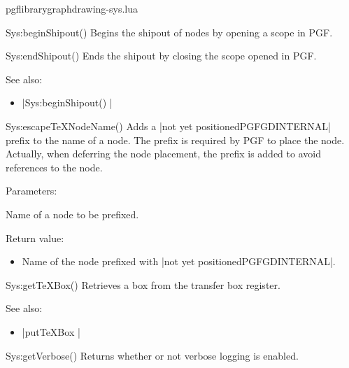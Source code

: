 
\begin{filedescription}{pgflibrarygraphdrawing-sys.lua}


\begin{luacommand}{{Sys:beginShipout}()}
Begins the shipout of nodes by opening a scope in PGF. 



\end{luacommand}\begin{luacommand}{{Sys:endShipout}()}
Ends the shipout by closing the scope opened in PGF. 



See also:
\begin{itemize}
	\item[] |Sys:beginShipout() |
\end{itemize}

\end{luacommand}\begin{luacommand}{{Sys:escapeTeXNodeName}()}
Adds a |not yet positionedPGFGDINTERNAL| prefix to the name of a node.  The prefix is required by PGF to place the node. Actually, when deferring the node placement, the prefix is added to avoid references to the node. 

Parameters:
\begin{parameterdescription}
	\item[\meta{name}] Name of a node to be prefixed. 
\end{parameterdescription}


Return value:
\begin{itemize} \item[] Name of the node prefixed with |not yet positionedPGFGDINTERNAL|.  \end{itemize}


\end{luacommand}\begin{luacommand}{{Sys:getTeXBox}()}
Retrieves a box from the transfer box register. 



See also:
\begin{itemize}
	\item[] |putTeXBox |
\end{itemize}

\end{luacommand}\begin{luacommand}{{Sys:getVerbose}()}
Returns whether or not verbose logging is enabled. 



\end{luacommand}
\end{filedescription}
